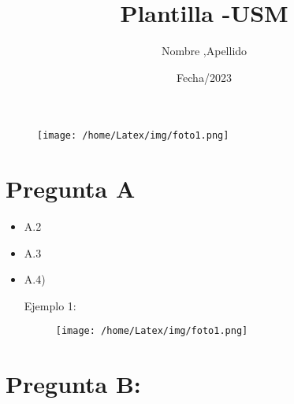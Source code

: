 \documentclass[10pt]{article}
\author{Nombre ,Apellido }
\date{Fecha/2023}
\begin{document}
	\begin{figure}
		\texttt{[image: /home/Latex/img/foto1.png]} %
		\centering
	\end{figure}
	
	\title{Plantilla -USM}
	
	\maketitle
	
	\section{Pregunta A} 
	\begin{itemize}
		
		\lipsum
		
		
		
	\end{itemize}
	\begin{itemize}
		\item A.2\\
		\lipsum
		
	\end{itemize}
	\begin{itemize}
		\item A.3
		
		\lipsum
	\end{itemize}
	\begin{itemize}
		\item A.4) \\
		
		\par Ejemplo 1:
		
		\begin{figure}[h] 
			
			\centering
			\texttt{[image: /home/Latex/img/foto1.png]} %
			
		\end{figure}
		
	\end{itemize}
	
	\section{Pregunta B: }
	
	\begin{itemize}
		\lipsum
		
	\end{itemize}
	
\end{document}
